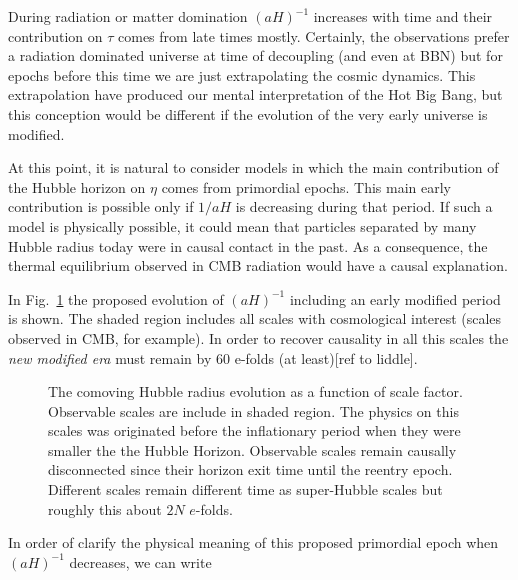\documentclass[12pt,letterpaper,twoside]{book}
\begin{document}
During radiation or matter domination $\left( aH\right)^{-1}$ increases with
time and their contribution on $\tau$ comes from late times mostly. Certainly,
the observations prefer a radiation dominated universe at time of decoupling
(and even at BBN) but for epochs before this time we are just extrapolating the
cosmic dynamics. This extrapolation have produced our mental interpretation of
the Hot Big Bang, but this conception would be different if the evolution of the
very early universe is modified.


At this point, it is natural to consider models in which the main contribution
of the Hubble horizon on $\eta$ comes from primordial epochs. This main early
contribution is possible only if $1/aH$ is decreasing during that period.  If
such a model is physically possible, it could mean that particles separated by
many Hubble radius today were in causal contact in the past. As a consequence,
the thermal equilibrium observed in CMB radiation would have a causal
explanation.

 In Fig.~\ref{Fig:Horizon_&_Scales} the proposed evolution of $(aH)^{-1}$
 including an early modified period is shown. The shaded region includes all scales
 with cosmological interest (scales observed in CMB, for example). In order to
 recover causality in all this scales the \textit{new modified era} must remain
 by 60 e-folds (at least)[ref to liddle].

 \begin{figure}[tb]%
     \begin{center}
         \resizebox{0.6\textwidth}{!}{}
         \caption{The comoving Hubble radius evolution as a function of scale
             factor.  Observable scales are include in shaded region. The
             physics on this scales was originated before the inflationary
             period when they were smaller the the Hubble Horizon.  Observable
             scales remain causally disconnected since their horizon exit time
             until the reentry epoch. Different scales remain different time as
             super-Hubble scales but roughly this about $2N$ $e$-folds.    }
         \label{Fig:Horizon_&_Scales}
     \end{center}
 \end{figure}


In order of clarify the physical meaning of this proposed primordial epoch when
$\left( aH\right)^{-1}$ decreases, we can write
\end{document}
